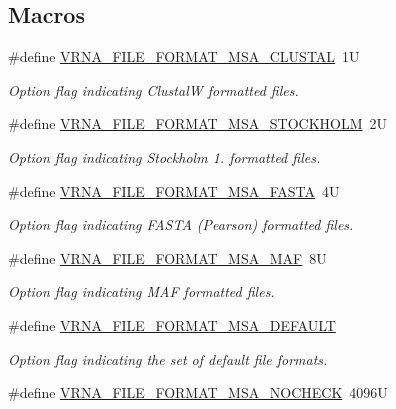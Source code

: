 \subsection*{Macros}
\begin{DoxyCompactItemize}
\item 
\#define \hyperlink{group__file__utils_ga79a23de2c7249f2cccd762e475c81859}{V\+R\+N\+A\+\_\+\+F\+I\+L\+E\+\_\+\+F\+O\+R\+M\+A\+T\+\_\+\+M\+S\+A\+\_\+\+C\+L\+U\+S\+T\+AL}~1U
\begin{DoxyCompactList}\small\item\em Option flag indicating ClustalW formatted files. \end{DoxyCompactList}\item 
\#define \hyperlink{group__file__utils_ga62be992445cd8ab2ad7a8fded944338b}{V\+R\+N\+A\+\_\+\+F\+I\+L\+E\+\_\+\+F\+O\+R\+M\+A\+T\+\_\+\+M\+S\+A\+\_\+\+S\+T\+O\+C\+K\+H\+O\+LM}~2U
\begin{DoxyCompactList}\small\item\em Option flag indicating Stockholm 1. formatted files. \end{DoxyCompactList}\item 
\#define \hyperlink{group__file__utils_gacf6274a2c825f34e4131404665b00604}{V\+R\+N\+A\+\_\+\+F\+I\+L\+E\+\_\+\+F\+O\+R\+M\+A\+T\+\_\+\+M\+S\+A\+\_\+\+F\+A\+S\+TA}~4U
\begin{DoxyCompactList}\small\item\em Option flag indicating F\+A\+S\+TA (Pearson) formatted files. \end{DoxyCompactList}\item 
\#define \hyperlink{group__file__utils_gab3186d774c01570d2a47d0308eec4927}{V\+R\+N\+A\+\_\+\+F\+I\+L\+E\+\_\+\+F\+O\+R\+M\+A\+T\+\_\+\+M\+S\+A\+\_\+\+M\+AF}~8U
\begin{DoxyCompactList}\small\item\em Option flag indicating M\+AF formatted files. \end{DoxyCompactList}\item 
\#define \hyperlink{group__file__utils_ga4acc255373831856a8417b68de8a94c0}{V\+R\+N\+A\+\_\+\+F\+I\+L\+E\+\_\+\+F\+O\+R\+M\+A\+T\+\_\+\+M\+S\+A\+\_\+\+D\+E\+F\+A\+U\+LT}
\begin{DoxyCompactList}\small\item\em Option flag indicating the set of default file formats. \end{DoxyCompactList}\item 
\#define \hyperlink{group__file__utils_ga229fb3778ecabea4782902b69fa48fd1}{V\+R\+N\+A\+\_\+\+F\+I\+L\+E\+\_\+\+F\+O\+R\+M\+A\+T\+\_\+\+M\+S\+A\+\_\+\+N\+O\+C\+H\+E\+CK}~4096U

\end{DoxyCompactItemize}
